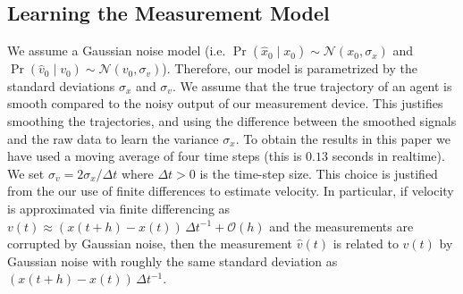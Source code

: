 \documentclass[letterpaper,10pt,conference]{ieeeconf}
\begin{document}
  \subsection{Learning the Measurement Model}
  We assume a Gaussian noise model (i.e. $\Pr( \hat{x}_0 \mid x_0 ) \sim \mathcal{N}( x_0 , \sigma_x)$ and $\Pr( \hat{v}_0 \mid v_0 ) \sim \mathcal{N}( v_0, \sigma_v)$).
  Therefore, our model is parametrized by the standard deviations $\sigma_x$ and $\sigma_v$.
  We assume that the true trajectory of an agent is smooth compared to the noisy output of our measurement device.
  This justifies smoothing the trajectories, and using the difference between the smoothed signals and the raw data to learn the variance $\sigma_x$.
  To obtain the results in this paper we have used a moving average of four time steps (this is $0.13$ seconds in realtime).
  We set $\sigma_v = 2 \sigma_x / \Delta t$ where $\Delta t > 0$ is the time-step size.  
  This choice is justified from the our use of finite differences to estimate velocity.
  In particular, if velocity is approximated via finite differencing as $v(t) \approx (x(t+h) - x(t))\,\Delta t^{-1} + \mathcal{O}(h)$ and the measurements are corrupted by Gaussian noise, then the measurement $\hat{v}(t)$ is related to $v(t)$ by Gaussian noise with roughly the same standard deviation as $(x(t+h) - x(t))\,\Delta t^{-1}$.
  
\end{document}
